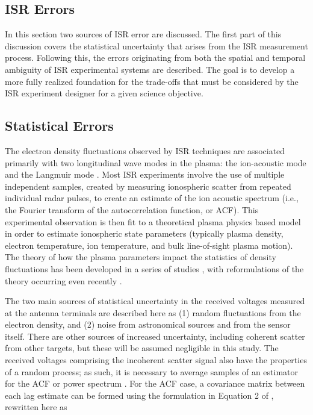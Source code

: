 \documentclass[draft,ras]{agutex}
\begin{document}
\begin{article}
\section{ISR Errors}

In this section two sources of ISR error are discussed. The first part of this discussion covers the statistical uncertainty that arises from the ISR measurement process. Following this, the errors originating from both the spatial and temporal ambiguity of ISR experimental systems are described. The goal is to develop a more fully realized foundation for the trade-offs that must be considered by the ISR experiment designer for a given science objective.

\subsection{Statistical Errors}

The electron density fluctuations observed by ISR techniques are associated primarily with two longitudinal wave modes in the plasma: the ion-acoustic mode and the Langmuir mode \citep{evans;isr}.  Most ISR experiments involve the use of multiple independent samples, created by measuring ionospheric scatter from repeated individual radar pulses, to create an estimate of the ion acoustic spectrum (i.e., the Fourier transform of the autocorrelation function, or ACF). This experimental observation is then fit to a theoretical plasma physics based model in order to estimate ionospheric state parameters (typically plasma density, electron temperature, ion temperature, and bulk line-of-sight plasma motion). The theory of how the plasma parameters impact the statistics of density fluctuations has been developed in a series of studies \citep{gordon58,dougherty:farley1960, farleydougherty:ISR2, doughteryfarley:ISR3, hagfors1961}, with reformulations of the theory occurring even recently  \citep{kudeki:milla:1,kudeki:milla:2}. 

The two main sources of statistical uncertainty in the received voltages measured at the antenna terminals are described here as (1) random fluctuations from the electron density, and (2) noise from astronomical sources and from  the sensor itself. There are other sources of increased uncertainty, including coherent scatter from other targets, but these will be assumed negligible in this study.  The received voltages comprising the incoherent scatter signal also have the properties of a random process; as such, it is necessary to average samples of an estimator for the ACF or power spectrum \citep{Diaz:2008co}.  For the ACF case, a covariance matrix between each lag estimate can be formed using the formulation in Equation 2 of \citet{hysell2008}, rewritten here as


\end{article}
\end{document}
